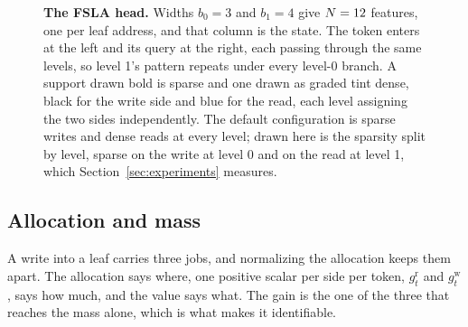 \begin{figure}[H]
\caption{\textbf{The FSLA head.} Widths $b_0 = 3$ and $b_1 = 4$ give $N = 12$ features, one per leaf address, and that column is the state. The token enters at the left and its query at the right, each passing through the same levels, so level 1's pattern repeats under every level-0 branch. A support drawn bold is sparse and one drawn as graded tint dense, black for the write side and blue for the read, each level assigning the two sides independently. The default configuration is sparse writes and dense reads at every level; drawn here is the sparsity split by level, sparse on the write at level 0 and on the read at level 1, which Section~\ref{sec:experiments} measures.}
\label{fig:head}
\end{figure}

\subsection{Allocation and mass}
\label{sec:allocation}

A write into a leaf carries three jobs, and normalizing the allocation keeps them apart. The allocation says where, one positive scalar per side per token, $g^{\mathrm{r}}_t$ and $g^{\mathrm{w}}_t$, says how much, and the value says what. The gain is the one of the three that reaches the mass alone, which is what makes it identifiable.

